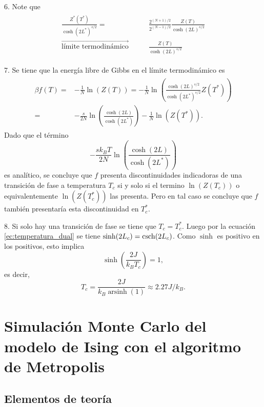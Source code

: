 \documentclass{article}
\DeclareMathOperator{\arsinh}{arsinh}
\begin{document}
6. Note que
\begin{align}
\begin{split}
\frac{Z^*(T^*)}{\cosh(2L^*)^{s/2}}=&\frac{2^{(N+1)/2}}{2^{(N-1)/2}}\frac{Z(T)}{\cosh(2L)^{s/2}}\\
\overrightarrow{\text{límite termodinámico}}\qquad&\frac{Z(T)}{\cosh(2L)^{s/2}}
\end{split}
\end{align}

7. Se tiene que la energía libre de Gibbs en el límite termodinámico es 
\begin{align}
\begin{split}
\beta f(T)=&-\frac{1}{N}\ln(Z(T))=-\frac{1}{N}\ln(\frac{\cosh(2L)^{s/2}}{\cosh(2L^*)^{s/2}}Z(T^*))\\
=&-\frac{s}{2N}\ln(\frac{\cosh(2L)}{\cosh(2L^*)})-\frac{1}{N}\ln(Z(T^*)).
\end{split}
\end{align}
Dado que el término 
\begin{equation}
-\frac{sk_B T}{2N}\ln(\frac{\cosh(2L)}{\cosh(2L^*)})
\end{equation}
es analítico, se concluye que $f$ presenta discontinuidades indicadoras de una transición de fase a temperatura $T_c$ si y solo si el termino $\ln(Z(T_c))$ o equivalentemente $\ln(Z(T^*_c))$ las presenta. Pero en tal caso se concluye que $f$ también presentaría esta discontinuidad en $T_c^*$. 

8. Si solo hay una transición de fase se tiene que $T_c=T_c^*$. Luego por la ecuación \eqref{ec:temperatura_dual} se tiene $\sinh(2L_c)=\csch(2L_c)$. Como $\sinh$ es positivo en los positivos, esto implica
\begin{equation}
\sinh(\frac{2J}{k_B T_c})=1,
\end{equation}
es decir,
\begin{equation}\label{ec:temperatura_critica}
T_c=\frac{2J}{k_B\arsinh(1)}\approx 2.27J/k_B.
\end{equation}

\section{Simulación Monte Carlo del modelo de Ising con el algoritmo de Metropolis}

\subsection{Elementos de teoría}
\end{document}
